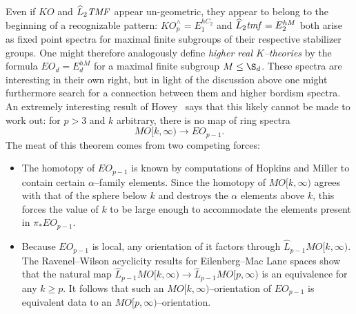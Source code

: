Even if \(KO\) and \(\widehat L_2 \mathit{TMF}\) appear un-geometric, they appear to belong to the beginning of a recognizable pattern: \(KO^\wedge_p = E_1^{hC_2}\) and \(\widehat L_2 \mathit{tmf} = E_2^{hM}\) both arise as fixed point spectra for maximal finite subgroups of their respective stabilizer groups.  One might therefore analogously define \textit{higher real \(K\)--theories} by the formula \(EO_d = E_d^{hM}\) for a maximal finite subgroup \(M \le \S_d\).  These spectra are interesting in their own right, but in light of the discussion above one might furthermore search for a connection between them and higher bordism spectra.  An extremely interesting result of Hovey~\cite[Proposition 2.3.4]{HoveyVnEltsOfRings} says that this likely cannot be made to work out: for \(p > 3\) and \(k\) arbitrary, there is no map of ring spectra \[MO[k, \infty) \to EO_{p-1}.\]  The meat of this theorem comes from two competing forces:
\begin{itemize}
    \item The homotopy of \(EO_{p-1}\) is known by computations of Hopkins and Miller to contain certain \(\alpha\)--family elements.  Since the homotopy of \(MO[k, \infty)\) agrees with that of the sphere below \(k\) and destroys the \(\alpha\) elements above \(k\), this forces the value of \(k\) to be large enough to accommodate the elements present in \(\pi_* EO_{p-1}\).
    \item Because \(EO_{p-1}\) is local, any orientation of it factors through \(\widehat L_{p-1} MO[k, \infty)\).  The Ravenel--Wilson acyclicity results for Eilenberg--Mac Lane spaces show that the natural map \(\widehat L_{p-1} MO[k, \infty) \to \widehat L_{p-1} MO[p, \infty)\) is an equivalence for any \(k \ge p\).  It follows that such an \(MO[k, \infty)\)--orientation of \(EO_{p-1}\) is equivalent data to an \(MO[p, \infty)\)--orientation.
\end{itemize}
